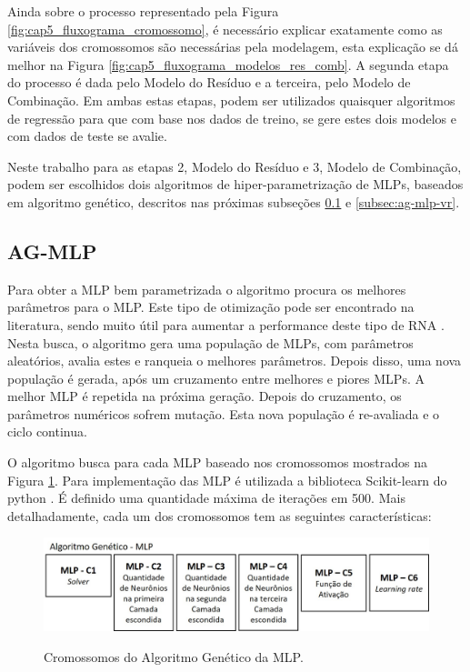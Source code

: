 Ainda sobre o processo representado pela Figura \ref{fig:cap5_fluxograma_cromossomo}, é necessário explicar exatamente como as variáveis dos cromossomos são necessárias pela modelagem, esta explicação se dá melhor na Figura \ref{fig:cap5_fluxograma_modelos_res_comb}. A segunda etapa do processo é dada pelo Modelo do Resíduo e a terceira, pelo Modelo de Combinação. Em ambas estas etapas, podem ser utilizados quaisquer algoritmos de regressão para que com base nos dados de treino, se gere estes dois modelos e com dados de teste se avalie.

Neste trabalho para as etapas 2, Modelo do Resíduo e 3, Modelo de Combinação, podem ser escolhidos dois algoritmos de hiper-parametrização de MLPs, baseados em algoritmo genético, descritos nas próximas subseções \ref{subsec:ag-mlp} e \ref{subsec:ag-mlp-vr}.

\subsection{AG-MLP}
\label{subsec:ag-mlp}

Para obter a MLP bem parametrizada o algoritmo procura os melhores parâmetros para o MLP. Este tipo de otimização pode ser encontrado na literatura, sendo muito útil para aumentar a performance deste tipo de RNA \cite{ramchoun2016multilayer, idrissi2016genetic} . Nesta busca, o algoritmo gera uma população de MLPs, com parâmetros aleatórios, avalia estes e ranqueia o melhores parâmetros. Depois disso, uma nova população é gerada, após um cruzamento entre melhores e piores MLPs. A melhor MLP é repetida na próxima geração. Depois do cruzamento, os parâmetros numéricos sofrem mutação. Esta nova população é re-avaliada e o ciclo continua.

O algoritmo busca para cada MLP baseado nos cromossomos mostrados na Figura \ref{fig:cap5_cromo_mlp}. Para implementação das MLP é utilizada a biblioteca Scikit-learn do python \cite{scikit-learn}. É definido uma quantidade máxima de iterações em 500. Mais detalhadamente, cada um dos cromossomos tem as seguintes características:

\begin{figure}[bp]
    \centering
    \caption{Cromossomos do Algoritmo Genético da MLP.}
    \includegraphics[width=\textwidth]{Figuras/cap5/cromo_mlp.jpg}
    \label{fig:cap5_cromo_mlp}
\end{figure}

